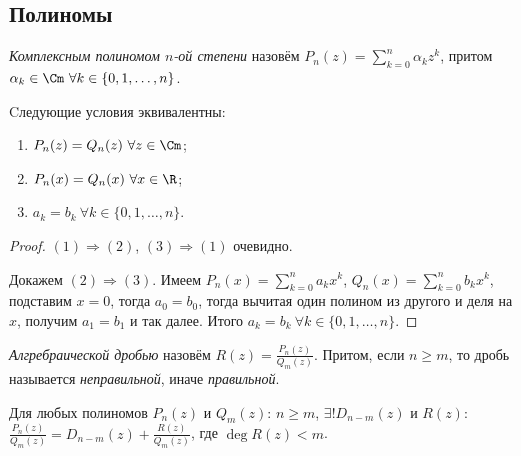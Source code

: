 \subsection{Полиномы}
\begin{definition}
    \textit{Комплексным полиномом $n$-ой степени} назовём $\displaystyle P_{n} (z) = \sum_{k = 0}^{n} \alpha_{k} z^{k}$, притом $\alpha_{k} \in \Cm \  \forall k \in \{ 0, 1, \ldots, n \}$.
\end{definition}
\begin{proposition}
    \hypertarget{prop6.1}{Cледующие условия эквивалентны:}
    \begin{enumerate}
        \item $P_{n} (z) = Q_{n} (z) \  \forall z \in \Cm$;
        \item $P_{n} (x) = Q_{n} (x) \  \forall x \in \R$;
        \item $a_{k} = b_{k} \  \forall k \in \{0, 1, \ldots, n \}$.
    \end{enumerate}
\end{proposition}
\begin{proof}
    $(1) \Rightarrow (2)$, $(3) \Rightarrow (1)$ очевидно.

    Докажем $(2) \Rightarrow (3)$. Имеем $\displaystyle P_{n} (x) = \sum_{k = 0}^{n} a_{k} x^{k}$, $\displaystyle Q_{n} (x) = \sum_{k = 0}^{n} b_{k} x^{k}$, подставим $x = 0$, тогда $a_{0} = b_{0}$, тогда вычитая один полином из другого и деля на $x$, получим $a_{1} = b_{1}$ и так далее. Итого $a_{k} = b_{k} \  \forall k \in \{ 0, 1, \ldots, n \}$.
\end{proof}
\begin{definition}
    \textit{Алгребраической дробью} назовём $R (z) = \frac{P_{n} (z)}{Q_{m} (z)}$. Притом, если $n \geq m$, то дробь называется \textit{неправильной}, иначе \textit{правильной}.
\end{definition}
\begin{theorem}
    \hypertarget{thm6.4}{Для любых полиномов $P_{n} (z)$ и $Q_{m} (z)$: $n \geq m$, $\exists! D_{n - m} (z)$ и $R (z)$: $\displaystyle \frac{P_{n} (z)}{Q_{m} (z)} = D_{n - m} (z) + \frac{R (z)}{Q_{m} (z)}$, где $\deg{R (z)} < m$.}
\end{theorem}
